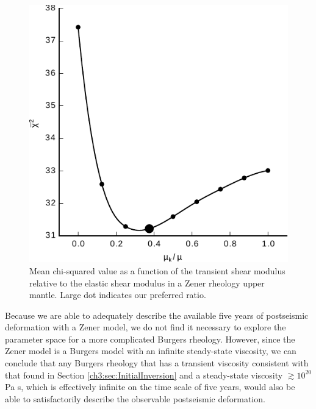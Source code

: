 \begin{figure}
\includegraphics[scale=1.0]{ch3/figures/2016jb013114-f13}
\caption{Mean chi-squared value as a function of the transient shear modulus relative to the elastic shear modulus in a Zener rheology upper mantle. Large dot indicates our preferred ratio.}
\label{ch3:fig:ShearModulusRatio}
\end{figure}

Because we are able to adequately describe the available five years of postseismic deformation with a Zener model, we do not find it necessary to explore the parameter space for a more complicated Burgers rheology.  However, since the Zener model is a Burgers model with an infinite steady-state viscosity, we can conclude that any Burgers rheology that has a transient viscosity consistent with that found in Section \ref{ch3:sec:InitialInversion} and a steady-state viscosity $\gtrsim10^{20}$ Pa s, which is effectively infinite on the time scale of five years, would also be able to satisfactorily describe the observable postseismic deformation.        
  
